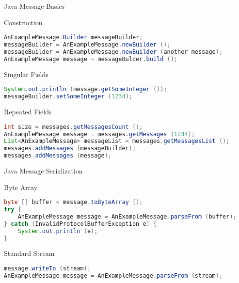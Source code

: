 \begin{frame}[fragile]{Java Message Basics}
    \begin{block}{Construction}
\begin{lstlisting}[language=java,style=mini]
AnExampleMessage.Builder messageBuilder;
messageBuilder = AnExampleMessage.newBuilder ();
messageBuilder = AnExampleMessage.newBuilder (another_message);
AnExampleMessage message = messageBulder.build ();
\end{lstlisting}
    \end{block}
    \begin{block}{Singular Fields}
\begin{lstlisting}[language=java,style=mini]
System.out.println (message.getSomeInteger ());
messageBuilder.setSomeInteger (1234);
\end{lstlisting}
    \end{block}
    \begin{block}{Repeated Fields}
\begin{lstlisting}[language=java,style=mini]
int size = messages.getMessagesCount ();
AnExampleMessage message = messages.getMessages (1234);
List<AnExampleMessage> messageList = messages.getMessagesList ();
messages.addMessages (messageBuilder);
messages.addMessages (message);
\end{lstlisting}
    \end{block}
\end{frame}


\begin{frame}[fragile]{Java Message Serialization}
    \begin{block}{Byte Array}
\begin{lstlisting}[language=java,style=mini]
byte [] buffer = message.toByteArray ();
try {
    AnExampleMessage message = AnExampleMessage.parseFrom (buffer);
} catch (InvalidProtocolBufferException e) {
    System.out.println (e);
}
\end{lstlisting}
    \end{block}

    \bigskip

    \begin{block}{Standard Stream}
\begin{lstlisting}[language=java,style=mini]
message.writeTo (stream);
AnExampleMessage message = AnExampleMessage.parseFrom (stream);
\end{lstlisting}
    \end{block}
\end{frame}


